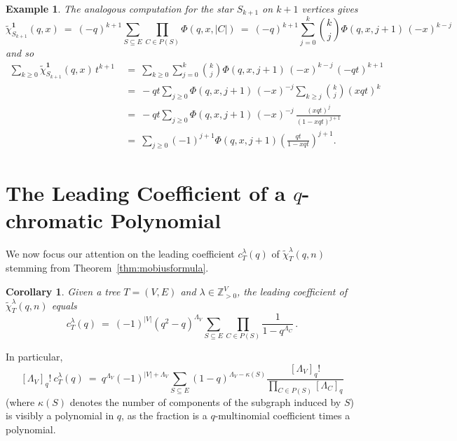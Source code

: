 \documentclass[11pt]{amsart}
\newtheorem{corollary}[theorem]{Corollary}
\newtheorem{exam}{Example}
\newenvironment{example}{\begin{exam}\sf}{\end{exam}}
\newcommand\ZZ{\mathbb{Z}}
\newcommand\bone{\mathbf{1}}
\begin{document}
\begin{example}\label{ex:stars}
The analogous computation for the star $S_{ k+1 }$ on $k+1$ vertices gives
\[
\widetilde\chi^\bone_{ S_{ k+1 } }(q,x)
  \ = \ (-q)^{k+1} \sum_{S\subseteq E} \prod_{C \in P(S)} \Phi(q,x, |C|)
  \ = \ (-q)^{k+1} \sum_{ j=0 }^{ k } \binom k j \Phi(q,x,j+1) \, (-x)^{ k-j } 
\]
and so
\begin{align*}
  \sum_{ k \ge 0 } \widetilde\chi^\bone_{ S_{ k+1 } }(q,x) \, t^{ k+1 }
  \ &= \ \sum_{ k \ge 0 } \sum_{ j=0 }^{ k } \binom k j \Phi(q,x,j+1) \, (-x)^{ k-j } \, (-qt)^{k+1} \\
    &= \ -qt \sum_{ j \ge 0 } \Phi(q,x,j+1) \, (-x)^{ -j } \sum_{ k \ge j } \binom k j (xqt)^k \\
    &= \ -qt \sum_{ j \ge 0 } \Phi(q,x,j+1) \, (-x)^{ -j } \, \frac{ (xqt)^j }{ (1-xqt)^{ j+1 }  } \\
    &= \ \sum_{ j \ge 0 } (-1)^{ j+1 }  \Phi(q,x,j+1) \left( \frac{ qt }{ 1-xqt } \right)^{ j+1 } .
\end{align*}
\end{example}


\section{The Leading Coefficient of a $q$-chromatic Polynomial}\label{sec:leadingcoeff}

We now focus our attention on the leading coefficient $c^{ \lambda }_T (q)$ of $\widetilde\chi^\lambda_T(q,n)$ stemming from Theorem~\ref{thm:mobiusformula}.

\begin{corollary}\label{cor:mobiusformula}
Given a tree $T=(V,E)$ and $\lambda \in \ZZ_{>0}^V$, the leading coefficient of $\widetilde\chi^\lambda_T(q,n)$ equals
\[
  c^{ \lambda }_T (q)
  \ = \ (-1)^{ |V| } (q^2-q)^{ \Lambda_V } \sum_{S\subseteq E} \prod_{ C \in P(S) } \frac{ 1 }{ 1 - q^{ \Lambda_C } } \, .
\]
\end{corollary}

In particular,
\[
  [\Lambda_V]_q! \ c^{ \lambda }_T (q)
  \ = \ q^{ \Lambda_V } (-1)^{ |V| + \Lambda_V } \sum_{S\subseteq E} (1-q)^{ \Lambda_V - \kappa(S) } \frac{ [\Lambda_V]_q! }{ \prod_{ C \in P(S) } [\Lambda_C]_q }
\]
(where $\kappa(S)$ denotes the number of components of the subgraph induced by $S$) is visibly a polynomial in $q$, as the fraction is a $q$-multinomial coefficient times a polynomial.
\end{document}
